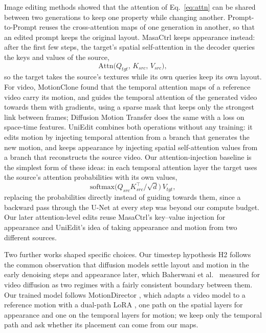 \documentclass[twoside,english]{article}
\begin{document}
Image editing methods showed that the attention of Eq.~\eqref{eq:attn} can be shared between two
generations to keep one property while changing another. Prompt-to-Prompt \citep{hertz2023p2p} reuses
the cross-attention maps of one generation in another, so that an edited prompt keeps the original
layout. MasaCtrl \citep{cao2023masactrl} keeps appearance instead: after the first few steps, the
target's spatial self-attention in the decoder queries the keys and values of the source,
\begin{equation}
\mathrm{Attn}\big(Q_{tgt},\, K_{src},\, V_{src}\big), \label{eq:masactrl}
\end{equation}
so the target takes the source's textures while its own queries keep its own layout. For video,
MotionClone \citep{ling2025motionclone} found that the temporal attention maps of a reference video
carry its motion, and guides the temporal attention of the generated video towards them with
gradients, using a sparse mask that keeps only the strongest link between frames; Diffusion Motion
Transfer \citep{yatim2024dmt} does the same with a loss on space-time features. UniEdit
\citep{bai2024uniedit} combines both operations without any training: it edits motion by injecting
temporal attention from a branch that generates the new motion, and keeps appearance by injecting
spatial self-attention values from a branch that reconstructs the source video. Our attention-injection
baseline is the simplest form of these ideas: in each temporal attention layer the target uses the
source's attention probabilities with its own values,
\begin{equation}
\mathrm{softmax}\big(Q_{src}K_{src}^\top/\sqrt{d}\big)\,V_{tgt}, \label{eq:attn_inject}
\end{equation}
replacing the probabilities directly instead of guiding towards them, since a backward pass through
the U-Net at every step was beyond our compute budget. Our later attention-level edits reuse MasaCtrl's
key--value injection for appearance and UniEdit's idea of taking appearance and motion from two
different sources.

Two further works shaped specific choices. Our timestep hypothesis H2 follows the common observation
that diffusion models settle layout and motion in the early denoising steps and appearance later, which
Baherwani et al.\ \citep{baherwani2025timesteps} measured for video diffusion as two regimes with a
fairly consistent boundary between them. Our trained model follows MotionDirector
\citep{zhao2024motiondirector}, which adapts a video model to a reference motion with a dual-path LoRA
\citep{hu2022lora}, one path on the spatial layers for appearance and one on the temporal layers for
motion; we keep only the temporal path and ask whether its placement can come from our maps.
\end{document}
